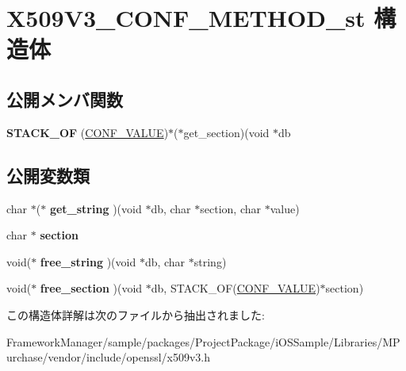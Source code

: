\hypertarget{struct_x509_v3___c_o_n_f___m_e_t_h_o_d__st}{}\section{X509\+V3\+\_\+\+C\+O\+N\+F\+\_\+\+M\+E\+T\+H\+O\+D\+\_\+st 構造体}
\label{struct_x509_v3___c_o_n_f___m_e_t_h_o_d__st}
\subsection*{公開メンバ関数}
\begin{DoxyCompactItemize}
\item 
\hypertarget{struct_x509_v3___c_o_n_f___m_e_t_h_o_d__st_a682410d8863d17e814a12e495c053490}{}{\bfseries S\+T\+A\+C\+K\+\_\+\+O\+F} (\hyperlink{struct_c_o_n_f___v_a_l_u_e}{C\+O\+N\+F\+\_\+\+V\+A\+L\+U\+E})$\ast$($\ast$get\+\_\+section)(void $\ast$db\label{struct_x509_v3___c_o_n_f___m_e_t_h_o_d__st_a682410d8863d17e814a12e495c053490}

\end{DoxyCompactItemize}
\subsection*{公開変数類}
\begin{DoxyCompactItemize}
\item 
\hypertarget{struct_x509_v3___c_o_n_f___m_e_t_h_o_d__st_a122df56f2ef2704b4362b5767c3571c0}{}char $\ast$($\ast$ {\bfseries get\+\_\+string} )(void $\ast$db, char $\ast$section, char $\ast$value)\label{struct_x509_v3___c_o_n_f___m_e_t_h_o_d__st_a122df56f2ef2704b4362b5767c3571c0}

\item 
\hypertarget{struct_x509_v3___c_o_n_f___m_e_t_h_o_d__st_ac0685c3b398f0093e4d5c44c90259ac4}{}char $\ast$ {\bfseries section}\label{struct_x509_v3___c_o_n_f___m_e_t_h_o_d__st_ac0685c3b398f0093e4d5c44c90259ac4}

\item 
\hypertarget{struct_x509_v3___c_o_n_f___m_e_t_h_o_d__st_aaebdc3bd7c731ad447fc1abb8f4a6bd8}{}void($\ast$ {\bfseries free\+\_\+string} )(void $\ast$db, char $\ast$string)\label{struct_x509_v3___c_o_n_f___m_e_t_h_o_d__st_aaebdc3bd7c731ad447fc1abb8f4a6bd8}

\item 
\hypertarget{struct_x509_v3___c_o_n_f___m_e_t_h_o_d__st_aaaaced3765009180d953ec165a7fc849}{}void($\ast$ {\bfseries free\+\_\+section} )(void $\ast$db, S\+T\+A\+C\+K\+\_\+\+O\+F(\hyperlink{struct_c_o_n_f___v_a_l_u_e}{C\+O\+N\+F\+\_\+\+V\+A\+L\+U\+E})$\ast$section)\label{struct_x509_v3___c_o_n_f___m_e_t_h_o_d__st_aaaaced3765009180d953ec165a7fc849}

\end{DoxyCompactItemize}


この構造体詳解は次のファイルから抽出されました\+:\begin{DoxyCompactItemize}
\item 
Framework\+Manager/sample/packages/\+Project\+Package/i\+O\+S\+Sample/\+Libraries/\+M\+Purchase/vendor/include/openssl/x509v3.\+h\end{DoxyCompactItemize}
